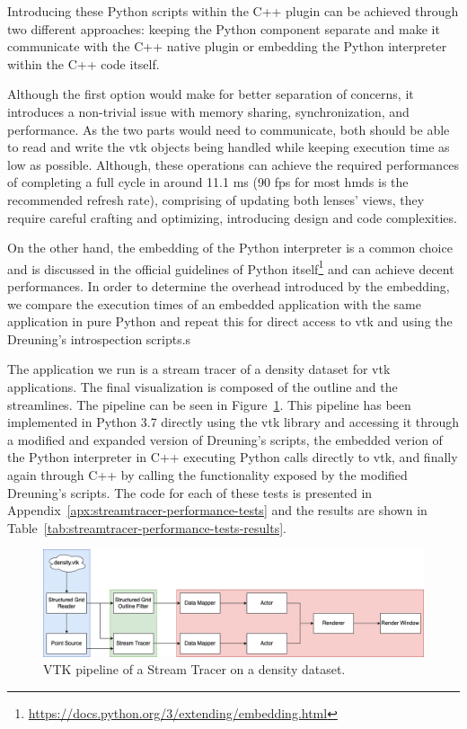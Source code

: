 Introducing these Python scripts within the C++ plugin can be achieved through two different approaches: keeping the Python component separate and make it communicate with the C++ native plugin or embedding the Python interpreter within the C++ code itself. 

Although the first option would make for better separation of concerns, it introduces a non-trivial issue with memory sharing, synchronization, and performance. As the two parts would need to communicate, both should be able to read and write the \acrshort{vtk} objects being handled while keeping execution time as low as possible. Although, these operations can achieve the required performances of completing a full cycle in around 11.1 ms (90 \acrshort{fps} for most \acrshort{hmd}s is the recommended refresh rate), comprising of updating both lenses' views, they require careful crafting and optimizing, introducing design and code complexities.

On the other hand, the embedding of the Python interpreter is a common choice and is discussed in the official guidelines of Python itself\footnote{\url{https://docs.python.org/3/extending/embedding.html}} and can achieve decent performances. In order to determine the overhead introduced by the embedding, we compare the execution times of an embedded application with the same application in pure Python and repeat this for direct access to \acrshort{vtk} and using the Dreuning's introspection scripts.s

The application we run is a stream tracer of a density dataset for \acrshort{vtk} applications. The final visualization is composed of the outline and the streamlines. The pipeline can be seen in Figure~\ref{fig:streamtracer_pipeline}. This pipeline has been implemented in Python 3.7 directly using the \acrshort{vtk} library and accessing it through a modified and expanded version of Dreuning's scripts, the embedded verion of the Python interpreter in C++ executing Python calls directly to \acrshort{vtk}, and finally again through C++ by calling the functionality exposed by the modified Dreuning's scripts. The code for each of these tests is presented in Appendix~\ref{apx:streamtracer-performance-tests} and the results are shown in Table~\ref{tab:streamtracer-performance-tests-results}.

\begin{figure}[ht!]
    \centering
    \includegraphics[width=\textwidth]{pictures/streamtracer_pipeline.png}
    \caption{VTK pipeline of a Stream Tracer on a density dataset.}
    \label{fig:streamtracer_pipeline}
\end{figure}


